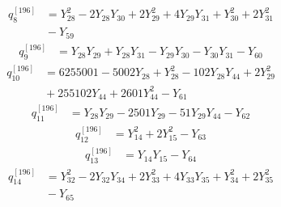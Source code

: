 \begin{equation}\label{q196:row:008}
\begin{aligned}
q_{8}^{[196]} &={} Y_{28}^{2} - 2Y_{28}Y_{30} + 2Y_{29}^{2} + 4Y_{29}Y_{31} + Y_{30}^{2} + 2Y_{31}^{2}\\
&{} - Y_{59}
\end{aligned}
\end{equation}
\begin{equation}\label{q196:row:009}
\begin{aligned}
q_{9}^{[196]} &={} Y_{28}Y_{29} + Y_{28}Y_{31} - Y_{29}Y_{30} - Y_{30}Y_{31} - Y_{60}
\end{aligned}
\end{equation}
\begin{equation}\label{q196:row:010}
\begin{aligned}
q_{10}^{[196]} &={} 6255001 - 5002Y_{28} + Y_{28}^{2} - 102Y_{28}Y_{44} + 2Y_{29}^{2}\\
&{} + 255102Y_{44} + 2601Y_{44}^{2} - Y_{61}
\end{aligned}
\end{equation}
\begin{equation}\label{q196:row:011}
\begin{aligned}
q_{11}^{[196]} &={} Y_{28}Y_{29} - 2501Y_{29} - 51Y_{29}Y_{44} - Y_{62}
\end{aligned}
\end{equation}
\begin{equation}\label{q196:row:012}
\begin{aligned}
q_{12}^{[196]} &={} Y_{14}^{2} + 2Y_{15}^{2} - Y_{63}
\end{aligned}
\end{equation}
\begin{equation}\label{q196:row:013}
\begin{aligned}
q_{13}^{[196]} &={} Y_{14}Y_{15} - Y_{64}
\end{aligned}
\end{equation}
\begin{equation}\label{q196:row:014}
\begin{aligned}
q_{14}^{[196]} &={} Y_{32}^{2} - 2Y_{32}Y_{34} + 2Y_{33}^{2} + 4Y_{33}Y_{35} + Y_{34}^{2} + 2Y_{35}^{2}\\
&{} - Y_{65}
\end{aligned}
\end{equation}
